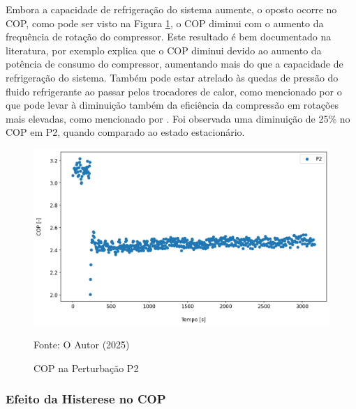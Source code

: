 Embora a capacidade de refrigeração do sistema aumente, o oposto ocorre no COP, como pode ser visto na Figura \ref{fig:Análise do COP Rotação}, o COP diminui com o aumento da frequência de rotação do compressor. Este resultado é bem documentado na literatura, por exemplo \textcite{MASCHE2021302} explica que o COP diminui devido ao aumento da potência de consumo do compressor, aumentando mais do que a capacidade de refrigeração do sistema. Também pode estar atrelado às quedas de pressão do fluido refrigerante ao passar pelos trocadores de calor, como mencionado por \textcite{CONSTANTINO2022101048} o que pode levar à diminuição também da eficiência da compressão em rotações mais elevadas, como mencionado por \textcite{stoecker1998industrial}. Foi observada uma diminuição de 25\% no COP em P2, quando comparado ao estado estacionário.
\newpage
\begin{figure}[h]
    \centering
    \includegraphics[width=1\linewidth]{FigurasdoTexto/COP Perturbação Rot.png}
    \caption{COP na Perturbação P2}
    \label{fig:Análise do COP Rotação}
    {\footnotesize Fonte: O Autor (2025)}
\end{figure}

\subsubsection{Efeito da Histerese no COP}

